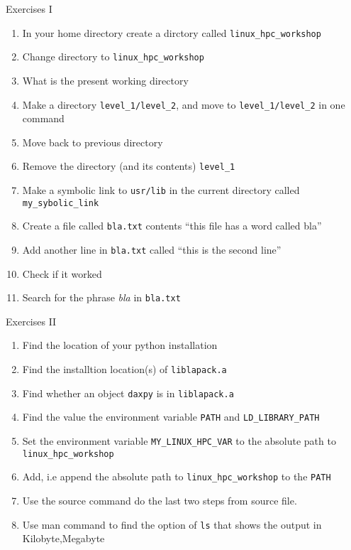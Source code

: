 \documentclass{beamer}
\begin{document}
\begin{frame}{Exercises I}
  \fontsize{8pt}{8}\selectfont
  \begin{enumerate}
    \item In your home directory create a dirctory called \texttt{linux\_hpc\_workshop}
    \item Change directory to \texttt{linux\_hpc\_workshop}
    \item What is the present working directory
    \item Make a directory \texttt{level\_1/level\_2}, and move to \texttt{level\_1/level\_2} in one command
    \item Move back to previous directory
    \item Remove the directory (and its contents) \texttt{level\_1}
    \item Make a symbolic link to \texttt{usr/lib} in the current directory called \texttt{my\_sybolic\_link}
    \item Create a file called \texttt{bla.txt} contents ``this file has a word called bla''
    \item Add another line in \texttt{bla.txt} called ``this is the second line''
    \item Check if it worked
    \item Search for the phrase \emph{bla} in \texttt{bla.txt}
  \end{enumerate}
\end{frame}


\begin{frame}{Exercises II}
  \fontsize{8pt}{8}\selectfont
  \begin{enumerate}
    \item Find the location of your python installation
    \item Find the installtion location(s) of \texttt{liblapack.a}
    \item Find whether an object \texttt{daxpy} is in \texttt{liblapack.a}
    \item Find the value the environment variable \texttt{PATH} and \texttt{LD\_LIBRARY\_PATH}
    \item Set the environment variable \texttt{MY\_LINUX\_HPC\_VAR} to the absolute path to \texttt{linux\_hpc\_workshop}
    \item Add, i.e append the absolute path to \texttt{linux\_hpc\_workshop} to the \texttt{PATH}
    \item Use the source command do the last two steps from source file.
    \item Use man command to find the option of \texttt{ls} that shows the output in Kilobyte,Megabyte
  \end{enumerate}
\end{frame}
\end{document}
